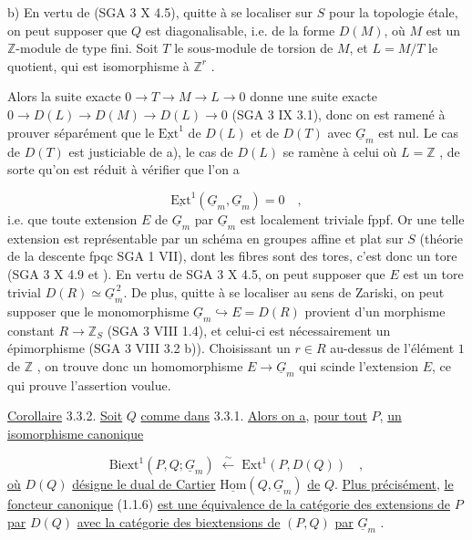b) En vertu de (SGA 3 X 4.5), quitte à se localiser sur $S$ pour la topologie étale, on peut supposer que $Q$ est diagonalisable, i.e. de la forme $D(M)$, où $M$ est un $\mathbb{Z}$-module de type fini. Soit $T$ le sous-module de torsion de $M$, et $L = M/T$ le quotient, qui est isomorphisme à $\mathbb{Z}^r$ .



Alors la suite exacte $0 \longrightarrow T \longrightarrow M \longrightarrow L \longrightarrow 0$ donne une suite exacte $0 \longrightarrow D(L) \longrightarrow D(M) \longrightarrow D(L) \longrightarrow 0$ (SGA 3 IX 3.1), donc on est ramené à prouver séparément que le $\underline{\mathrm{Ext}}^1$ de $D(L)$ et de $D(T)$ avec $\underline{G}_m$ est nul. Le cas de $D(T)$ est justiciable de a), le cas de $D(L)$ se ramène à celui où $L = \mathbb{Z}$ , de sorte qu'on est réduit à vérifier que l'on a

\begin{equation*}
\underline{\mathrm{Ext}}^1(\underline{G}_m,\underline{G}_m) = 0 \quad ,
\end{equation*}
i.e. que toute extension $E$ de $\underline{G}_m$ par $\underline{G}_m$ est localement triviale fppf. Or une telle extension est représentable par un schéma en groupes affine et plat sur $S$ (théorie de la descente fpqc SGA 1 VII), dont les fibres sont des tores, c'est donc un tore (SGA 3 X 4.9 et \qquad ). En vertu de SGA 3 X 4.5, on peut supposer que $E$ est un tore trivial $D(R) \simeq \underline{G}_m^{\,2}$. De plus, quitte à se localiser au sens de Zariski, on peut supposer que le monomorphisme $\underline{G}_m \hookrightarrow E = D(R)$ provient d'un morphisme constant $R \longrightarrow \mathbb{Z}_S$ (SGA 3 VIII 1.4), et celui-ci est nécessairement un épimorphisme (SGA 3 VIII 3.2 b)). Choisissant un $r \in R$ au-dessus de l'élément $1$ de $\mathbb{Z}$ , on trouve donc un homomorphisme $E \longrightarrow \underline{G}_m$ qui scinde l'extension $E$, ce qui prouve l'assertion voulue.

\underline{Corollaire} 3.3.2. \underline{Soit} $Q$ \underline{comme dans} 3.3.1. \underline{Alors on a}, \underline{pour tout} $P$, \underline{un isomorphisme canonique}

\begin{equation}\tag{3.3.2.1}
\mathrm{Biext}^1(P,Q;\underline{G}_m) \;\xleftarrow{\ \sim\ }\; \mathrm{Ext}^1(P,D(Q)) \quad ,
\end{equation}
\underline{où} $D(Q)$ \underline{désigne le dual de Cartier} $\underline{\mathrm{Hom}}(Q,\underline{G}_m)$ \underline{de} $Q$. \underline{Plus précisément}, \underline{le foncteur canonique} (1.1.6) \underline{est une équivalence de la catégorie des extensions de} $P$ \underline{par} $D(Q)$ \underline{avec la catégorie des biextensions de} $(P,Q)$ \underline{par} $\underline{G}_m$ .


